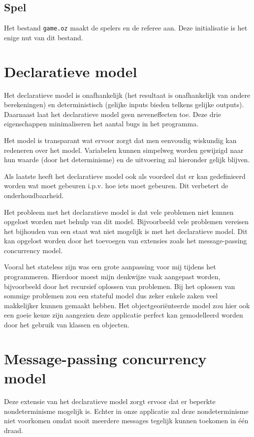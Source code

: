 \documentclass{article}
\begin{document}
\subsection{Spel}
Het bestand \texttt{game.oz} maakt de spelers en de referee aan. Deze initialisatie is het enige nut van dit bestand. 

\section{Declaratieve model}
Het declaratieve model is onafhankelijk (het resultaat is onafhankelijk van andere berekeningen) en deterministisch (gelijke inputs bieden telkens gelijke outputs). 
Daarnaast laat het declaratieve model geen neveneffecten toe. 
Deze drie eigenschappen minimaliseren het aantal bugs in het programma. 

Het model is transparant wat ervoor zorgt dat men eenvoudig wiskundig kan redeneren over het model. Variabelen kunnen simpelweg worden gewijzigd naar hun waarde (door het determinisme) en de uitvoering zal hieronder gelijk blijven. 

Als laatste heeft het declaratieve model ook als voordeel dat er kan gedefinieerd worden wat moet gebeuren i.p.v. hoe iets moet gebeuren. Dit verbetert de onderhoudbaarheid.

Het probleem met het declaratieve model is dat vele problemen niet kunnen opgelost worden met behulp van dit model. Bijvoorbeeld vele problemen vereisen het bijhouden van een staat wat niet mogelijk is met het declaratieve model.  Dit kan opgelost worden door het toevoegen van extensies zoals het message-passing concurrency model. 

Vooral het stateless zijn was een grote aanpassing voor mij tijdens het programmeren. Hierdoor moest mijn denkwijze vaak aangepast worden, bijvoorbeeld door het recursief oplossen van problemen. Bij het oplossen van sommige problemen zou een stateful model dus zeker enkele zaken veel makkelijker kunnen gemaakt hebben. Het objectgeoriënteerde model zou hier ook een goeie keuze zijn aangezien deze applicatie perfect kan gemodelleerd worden door het gebruik van klassen en objecten.

\section{Message-passing concurrency model}
Deze extensie van het declaratieve model zorgt ervoor dat er beperkte nondeterminisme mogelijk is. Echter in onze applicatie zal deze nondeterminisme niet voorkomen omdat nooit meerdere messages tegelijk kunnen toekomen in één draad. 
\end{document}

